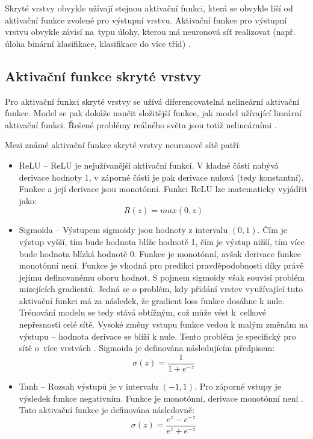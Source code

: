 Skryté vrstvy obvykle užívají stejnou aktivační funkci, která se obvykle liší od aktivační funkce zvolené pro výstupní vrstvu. Aktivační funkce pro výstupní vrstvu obvykle závisí na~typu úlohy, kterou má neuronová síť realizovat (např. úloha binární klasifikace, klasifikace do více tříd) \cite{HowToChooseActivationFunction}.

\subsection*{Aktivační funkce skryté vrstvy}
Pro aktivační funkci skryté vrstvy se užívá diferencovatelná nelineární aktivační funkce. Model se pak dokáže naučit složitější funkce, jak model užívající lineární aktivační funkci. Řešené problémy reálného světa jsou totiž nelineárními \cite{HowToChooseActivationFunction}. 

Mezi známé aktivační funkce skryté vrstvy neuronové sítě patří:
\begin{itemize}
    \item ReLU -- ReLU je nejužívanější aktivační funkcí. V kladné části nabývá derivace hodnoty 1, v záporné části je pak derivace nulová (tedy konstantní). Funkce a její derivace jsou monotónní. Funkci ReLU lze matematicky vyjádřit jako:
    \begin{equation} 
    R(z) = max(0, z)
    \end{equation} 
    \item Sigmoida -- Výstupem sigmoidy jsou hodnoty z intervalu $(0, 1)$. Čím je výstup vyšší, tím bude hodnota blíže hodnotě 1, čím je výstup nižší, tím více bude hodnota blízká hodnotě 0. Funkce je monotónní, avšak derivace funkce monotónní není. Funkce je vhodná pro predikci pravděpodobnosti díky právě jejímu definovanému oboru hodnot. S pojmem sigmoidy však souvisí problém mizejících gradientů. Jedná se o problém, kdy přidání vrstev využívající tuto aktivační funkci má za následek, že gradient loss funkce dosáhne k nule. Trénování modelu se tedy stává obtížným, což může vést k~celkové nepřesnosti celé sítě. Vysoké změny vstupu funkce vedou k malým změnám na výstupu -- hodnota derivace se blíží k nule. Tento problém je specifický pro sítě o~více vrstvách \cite{VanishingGradientProblem}. Sigmoida je definována následujícím předpisem:
     \begin{equation} 
    \sigma(z) = \frac{1}{1+e^{-z}}
    \end{equation} 
    \item Tanh -- Rozsah výstupů je v intervalu $(-1, 1)$. Pro záporné vstupy je výsledek funkce negativním. Funkce je monotónní, derivace monotónní není \cite{ActivationFunctionsInNeuralNetworks}. Tato aktivační funkce je definována následovně:
       \begin{equation} 
    \sigma(z) = \frac{e^{z}-e^{-z}}{e^{z}+e^{-z}}
    \end{equation} 
\end{itemize}

